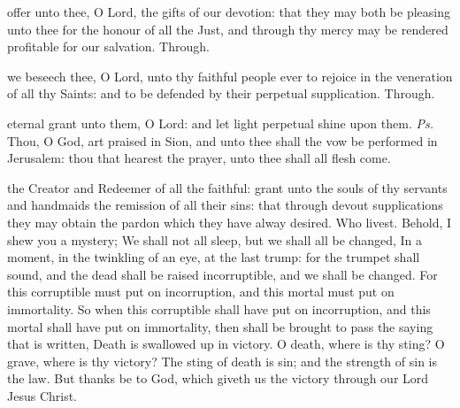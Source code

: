 
\secret\label{AllHallowsSecret}
 offer unto thee, O Lord, the gifts of our devotion: that they may both be pleasing unto thee for the honour of all the Just, and through thy mercy may be rendered profitable for our salvation. Through.


\postcommunion\label{AllHallowsPostcommunion}
 we beseech thee, O Lord, unto thy faithful people ever to rejoice in the veneration of all thy Saints: and to be defended by their perpetual supplication. Through.

\label{AllSouls}



\introit
{} eternal grant unto them, O Lord: and let light perpetual shine upon them. \textit{Ps.} Thou, O God, art praised in Sion, and unto thee shall the vow be performed in Jerusalem: thou that hearest the prayer, unto thee shall all flesh come.

\collect
{} the Creator and Redeemer of all the faithful: grant unto the souls of thy servants and handmaids the remission of all their sins: that through devout supplications they may obtain the pardon which they have alway desired. Who livest.
 Behold, I shew you a mystery; We shall not all sleep, but we shall all be changed, In a moment, in the twinkling of an eye, at the last trump: for the trumpet shall sound, and the dead shall be raised incorruptible, and we shall be changed. For this corruptible must put on incorruption, and this mortal must put on immortality. So when this corruptible shall have put on incorruption, and this mortal shall have put on immortality, then shall be brought to pass the saying that is written, Death is swallowed up in victory. O death, where is thy sting? O grave, where is thy victory? The sting of death is sin; and the strength of sin is the law. But thanks be to God, which giveth us the victory through our Lord Jesus Christ.

